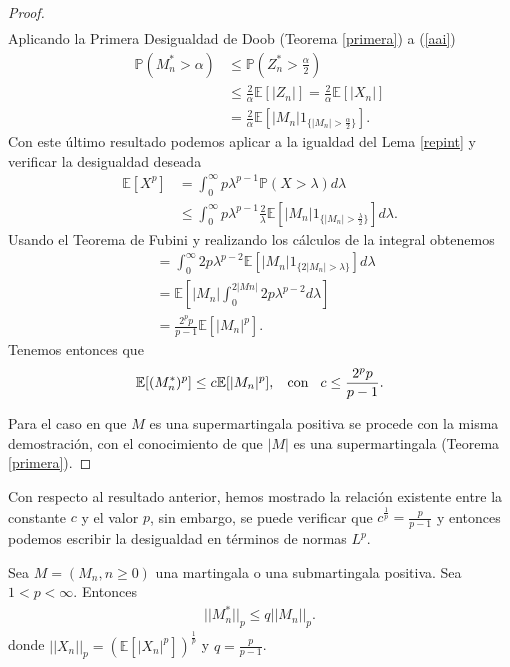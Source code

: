 \begin{proof}
\begin{align}
	\end{align}
	Aplicando la Primera Desigualdad de Doob (Teorema \ref{primera}) a (\ref{aai}) 
	\begin{align*}
		\mathbb{P}(M_n^{*} > \alpha) & \leq \mathbb{P}(Z_n^{*} > \frac{\alpha}{2}) \\
		& \leq \frac{2}{\alpha} \mathbb{E}[|Z_n|] = \frac{2}{\alpha} \mathbb{E}[|X_n|] \\
		& = \frac{2}{\alpha} \mathbb{E}[|M_n|1_{\{|M_n| > \frac{\alpha}{2}\}}].
	\end{align*}
	Con este último resultado podemos aplicar a la igualdad del Lema \ref{repint} y verificar la desigualdad deseada
	\begin{align*}
		\mathbb{E}[X^p] & = \int_0^{\infty} p \lambda^{p-1} \mathbb{P}(X > \lambda) d\lambda \\
		& \leq \int_0^{\infty} p \lambda^{p-1}  \frac{2}{\lambda} \mathbb{E}[|M_n|1_{\{|M_n| > \frac{\lambda}{2}\}}] d\lambda.
	\end{align*}
	Usando el Teorema de Fubini y realizando los cálculos de la integral obtenemos
	\begin{align*}
		& = \int_0^{\infty} 2p \lambda^{p-2} \mathbb{E}[|M_n|1_{\{2|M_n| > \lambda\}} ] d\lambda \\
		& = \mathbb{E}\left[ |M_n| \int_0^{2|Mn|} 2p\lambda^{p-2} d\lambda \right] \\
		& = \frac{2^p p}{p-1} \mathbb{E}[|M_n|^p].
	\end{align*}
	Tenemos entonces que
	\begin{align*}
	\mathbb{E}[(M_n^{*})^p] \leq c\mathbb{E}[|M_n|^p], \hspace{0.3cm} \text{con} \hspace{0.3cm} c \leq \frac{2^p p}{p-1}.
	\end{align*} 
	
Para el caso en que $M$ es una supermartingala positiva se procede con la misma demostración, con el conocimiento de que $|M|$ es una supermartingala (Teorema \ref{primera}).
\end{proof}

Con respecto al resultado anterior, hemos mostrado la relación existente entre la constante $c$ y el valor $p$, sin embargo, se puede verificar que $c^{\frac{1}{p}} = \frac{p}{p-1}$ y entonces podemos escribir la desigualdad en términos de normas $L^p$.

\begin{theorem}
\label{lp2}
	Sea $M = (M_n, n \geq 0)$ una martingala o una submartingala positiva. Sea $1 < p < \infty$. Entonces
	\begin{align*}
		||M_n^{*}||_p \leq q ||M_n||_p.
	\end{align*}
donde $||X_n||_p = (\mathbb{E}[|X_n|^p])^{\frac{1}{p}}$ y $q = \frac{p}{p-1} $.
\end{theorem}

